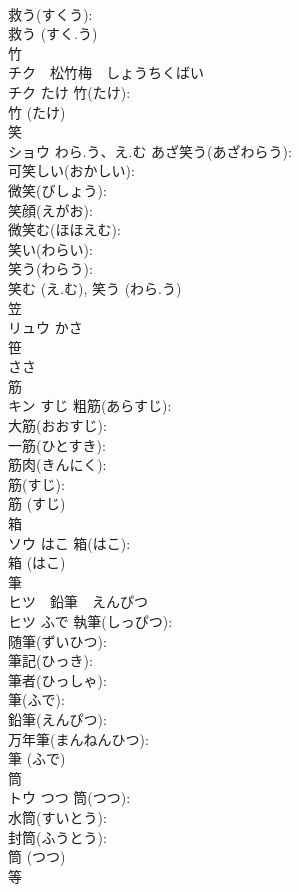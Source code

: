 \documentclass[8pt]{extreport}
\begin{document}
\begin{CJK}{UTF8}{min}
\\	救う(すくう): 
\\	救う (すく.う)
\\	竹			
\\	チク　松竹梅　しょうちくばい
\\	チク	たけ	竹(たけ): 
\\	竹 (たけ)
\\	笑			
\\	ショウ	わら.う、え.む	あざ笑う(あざわらう): 
\\	可笑しい(おかしい): 
\\	微笑(びしょう): 
\\	笑顔(えがお): 
\\	微笑む(ほほえむ): 
\\	笑い(わらい): 
\\	笑う(わらう): 
\\	笑む (え.む), 笑う (わら.う)
\\	笠			
\\	リュウ	かさ		
\\	笹			
\\	ささ		
\\	筋			
\\	キン	すじ	粗筋(あらすじ): 
\\	大筋(おおすじ): 
\\	一筋(ひとすき): 
\\	筋肉(きんにく): 
\\	筋(すじ): 
\\	筋 (すじ)
\\	箱			
\\	ソウ	はこ	箱(はこ): 
\\	箱 (はこ)
\\	筆			
\\	ヒツ　鉛筆　えんぴつ
\\	ヒツ	ふで	執筆(しっぴつ): 
\\	随筆(ずいひつ): 
\\	筆記(ひっき): 
\\	筆者(ひっしゃ): 
\\	筆(ふで): 
\\	鉛筆(えんぴつ): 
\\	万年筆(まんねんひつ): 
\\	筆 (ふで)
\\	筒			
\\	トウ	つつ	筒(つつ): 
\\	水筒(すいとう): 
\\	封筒(ふうとう): 
\\	筒 (つつ)
\\	等			

\end{CJK}
\end{document}
